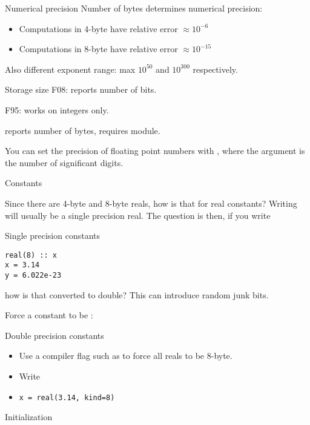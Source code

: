 \begin{block}{Numerical precision}
  \label{sl:fprecision48}
  Number of bytes determines numerical precision:
  \begin{itemize}
  \item Computations in 4-byte have relative error $\approx 10^{-6}$
  \item Computations in 8-byte have relative error $\approx 10^{-15}$
  \end{itemize}
  Also different exponent range: max $10^{50}$ and $10^{300}$ respectively.
\end{block}

\begin{block}{Storage size}
  F08:  reports number of bits.

  F95:  works on integers only.

   reports number of bytes, requires
   module.
\end{block}

You can set the precision of floating point numbers with
, where the argument is the number
of significant digits.

 {Constants}

Since there are 4-byte and 8-byte reals, how is that for real
constants? Writing  will usually be a single precision
real. The question is then, if you write
\begin{block}{Single precision constants}
  \label{sl:fsingle}
\begin{verbatim}
real(8) :: x
x = 3.14
y = 6.022e-23
\end{verbatim}
\end{block}

how is that converted to double? This can introduce random junk bits.

Force a constant to be :
\begin{block}{Double precision constants}
  \label{sl:fdouble}
  \begin{itemize}
  \item Use a compiler flag such as  to force all reals to be 8-byte.
  \item Write 
  \item \verb+x = real(3.14, kind=8)+
  \end{itemize}
\end{block}

 {Initialization}

